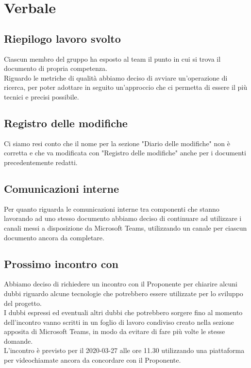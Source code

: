 \section{Verbale}
	
	\subsection{Riepilogo lavoro svolto}
		Ciascun membro del gruppo ha esposto al team il punto in cui si trova il documento di propria competenza. \\
		Riguardo le metriche di qualità abbiamo deciso di avviare un'operazione di ricerca, per poter adottare in seguito un'approccio che ci permetta di essere il più tecnici e precisi possibile.
		
		
	\subsection{Registro delle modifiche}
		Ci siamo resi conto che il nome per la sezione "Diario delle modifiche" non è corretta e che va modificata con "Registro delle modifiche" anche per i documenti precedentemente redatti.

	\subsection{Comunicazioni interne}
		Per quanto riguarda le comunicazioni interne tra componenti che stanno lavorando ad uno stesso documento abbiamo deciso di continuare ad utilizzare i canali messi a disposizione da Microsoft Teams, utilizzando un canale per ciascun documento ancora da completare.
		
	\subsection{Prossimo incontro con \Proponente{}}
		Abbiamo deciso di richiedere un incontro con il Proponente per chiarire alcuni dubbi riguardo alcune tecnologie che potrebbero essere utilizzate per lo sviluppo del progetto. \\
		I dubbi espressi ed eventuali altri dubbi che potrebbero sorgere fino al momento dell'incontro vanno scritti in un foglio di lavoro condiviso creato nella sezione apposita di Microsoft Teams, in modo da evitare di fare più volte le stesse domande. \\
		L'incontro è previsto per il 2020-03-27 alle ore 11.30 utilizzando una piattaforma per videochiamate ancora da concordare con il Proponente.


